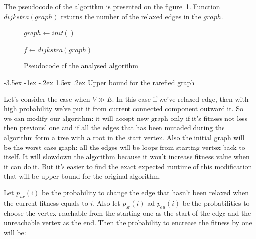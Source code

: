\documentclass[a4paper,10pt]{article}
\makeatletter
\theoremstyle{definition}
\renewcommand\section{\@startsection {section}{1}{\z@}%
                                   {-3.5ex \@plus -1ex \@minus -.2ex}%
                                   {1.5ex \@plus.2ex}%
                                   {\large\bfseries}}
\makeatother
\begin{document}
The pseudocode of the algorithm is presented on the figure~\ref{pseudocode}. Function $dijkstra(graph)$ returns the number of the relaxed edges in the $graph$.

\begin{figure}[ht]
\begin{center}
\begin{algorithm}[H]
  
  $graph \gets init()$
  
  $f \gets dijkstra(graph)$
  
  \end{algorithm}
  \caption{Pseudocode of the analysed algorithm}
  \label{pseudocode}
 \end{center}
\end{figure}

\section{Upper bound for the rarefied graph}
\label{sec:3}

Let's consider the case when $V \gg E$. In this case if we've relaxed edge, then with high probability we've put it from current connected component outward it. So we can modify our algorithm: it will accept new graph only if it's fitness not less then previous' one and if all the edges that has been mutaded during the algorithm form a tree with a root in the start vertex. Also the initial graph will be the worst case graph: all the edges will be loops from starting vertex back to itself. It will slowdown the algorithm because it won't increase fitness value when it can do it. But it's easier to find the exact expected runtime of this modification that will be upper bound for the original algorithm.

Let $p_{ur}(i)$ be the probability to change the edge that hasn't been relaxed when the current fitness equals to $i$. Also let $p_{sr}(i)$ ad $p_{eu}(i)$ be the probabilities to choose the vertex reachable from the starting one as the start of the edge and the unreachable vertex as the end.
 Then the probability to encrease the fitness by one will be:
 
\end{document}
